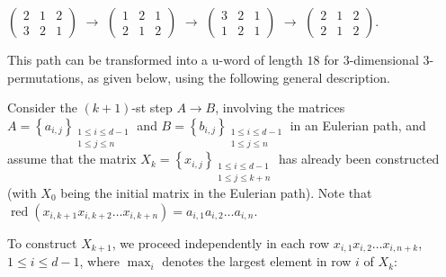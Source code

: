 \documentclass[12pt]{article}
\DeclareMathOperator{\red}{red}
\begin{document}
{\footnotesize$\left(\begin{array}{ccc} 2 & 1 & 2 \\ 3 & 2 & 1   \end{array}\right)$} $\rightarrow$
{\footnotesize$\left(\begin{array}{ccc} 1 & 2 & 1 \\ 2 & 1 & 2   \end{array}\right)$} $\rightarrow$
{\footnotesize$\left(\begin{array}{ccc} 3 & 2 & 1 \\ 1 & 2 & 1   \end{array}\right)$} $\rightarrow$
{\footnotesize$\left(\begin{array}{ccc} 2 & 1 & 2 \\ 2 & 1 & 2   \end{array}\right)$}.

\noindent
This path can be transformed into a u-word of length $18$ for $3$-dimensional $3$-permutations, as given below, using the following general description.

Consider the $(k+1)$-st step $A \rightarrow B$, involving the matrices  
$A = \left\{ a_{i,j} \right\}_{\substack{1 \le i \le d-1 \\ 1 \le j \le n}}$  
and  
$B = \left\{ b_{i,j} \right\}_{\substack{1 \le i \le d-1 \\ 1 \le j \le n}}$  
in an Eulerian path, and assume that the matrix  
$X_k = \left\{ x_{i,j} \right\}_{\substack{1 \le i \le d-1 \\ 1 \le j \le k+n}}$  
has already been constructed (with $X_0$ being the initial matrix in the Eulerian path). Note that $\red(x_{i,k+1}x_{i,k+2}\ldots x_{i,k+n})=a_{i,1}a_{i,2}\ldots a_{i,n}$.

To construct $X_{k+1}$, we proceed independently in each row  
$x_{i,1}x_{i,2}\ldots x_{i,n+k}$, $1 \leq i \leq d-1$,  
where $\max_i$ denotes the largest element in row $i$ of $X_k$:
\end{document}
